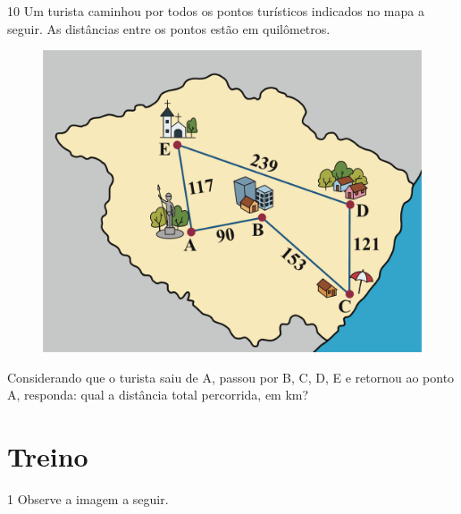 
\pagebreak
\num{10} Um turista caminhou por todos os pontos turísticos indicados no mapa a seguir.
As distâncias entre os pontos estão em quilômetros.

\begin{figure}[htpb!]
\centering
\includegraphics[width=\textwidth]{./ilustras-mat/modulo_12-atividade_10.png}
\end{figure}


Considerando que o turista saiu de A, passou por B, C, D, E e retornou ao ponto A,
responda: qual a distância total percorrida, em km?


\pagebreak
\section{Treino}

\num{1} Observe a imagem a seguir.


